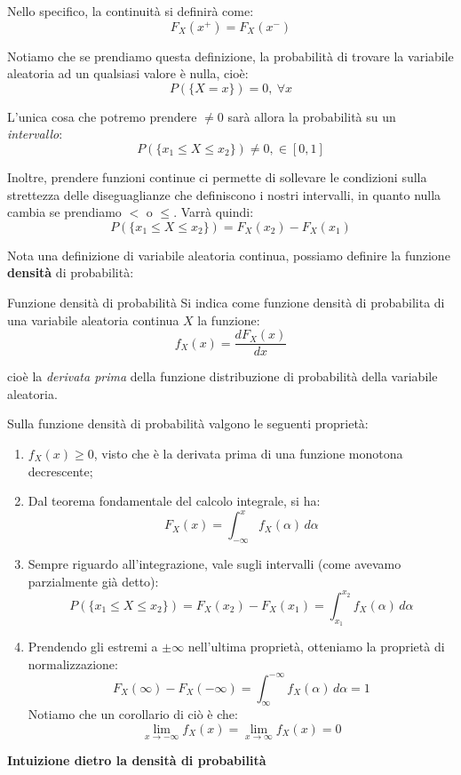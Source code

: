 \documentclass[a4paper,11pt]{article}
\begin{document}
Nello specifico, la continuità si definirà come:
$$
F_X(x^+) = F_X(x^-)
$$

Notiamo che se prendiamo questa definizione, la probabilità di trovare la variabile aleatoria ad un qualsiasi valore è nulla, cioè:
$$
P(\{ X = x \}) = 0, \ \forall x
$$

L'unica cosa che potremo prendere $\neq 0$ sarà allora la probabilità su un \textit{intervallo}:
$$
P(\{ x_1 \leq X \leq x_2 \}) \neq 0, \in [0, 1]
$$

Inoltre, prendere funzioni continue ci permette di sollevare le condizioni sulla strettezza delle diseguaglianze che definiscono i nostri intervalli, in quanto nulla cambia se prendiamo $<$ o $\leq$. Varrà quindi:
$$
P(\{ x_1 \leq X \leq x_2 \}) = F_X(x_2) - F_X(x_1)
$$

Nota una definizione di variabile aleatoria continua, possiamo definire la funzione \textbf{densità} di probabilità:
\begin{definition}{Funzione densità di probabilità}
Si indica come funzione densità di probabilita di una variabile aleatoria continua $X$ la funzione:
$$
f_X(x) = \frac{d F_X(x)}{dx}
$$
\end{definition}
cioè la \textit{derivata prima} della funzione distribuzione di probabilità della variabile aleatoria.

Sulla funzione densità di probabilità valgono le seguenti proprietà:
\begin{enumerate}
	\item $f_X(x) \geq 0$, visto che è la derivata prima di una funzione monotona decrescente;
	\item Dal teorema fondamentale del calcolo integrale, si ha:
$$
F_X(x) = \int_{-\infty}^x f_X(\alpha) \, d\alpha
$$
	\item Sempre riguardo all'integrazione, vale sugli intervalli (come avevamo parzialmente già detto):
$$
P(\{ x_1 \leq X \leq x_2 \}) = F_X(x_2) - F_X(x_1) = \int_{x_1}^{x_2} f_X(\alpha) \, d\alpha
$$
	\item Prendendo gli estremi a $\pm \infty$ nell'ultima proprietà, otteniamo la proprietà di normalizzazione:
$$
 F_X(\infty) - F_X(-\infty) = \int_{\infty}^{-\infty} f_X(\alpha) \, d\alpha = 1
$$
Notiamo che un corollario di ciò è che:
$$
\lim_{x\rightarrow-\infty} f_X(x) = \lim_{x\rightarrow\infty} f_X(x) = 0
$$
\end{enumerate}

\par\smallskip

\noindent
\textbf{\textsf{Intuizione dietro la densità di probabilità}}
\end{document}
